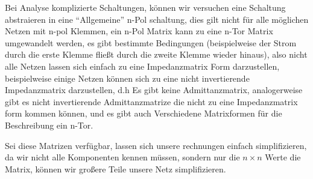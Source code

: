 %
%
%
Bei Analyse komplizierte Schaltungen, können wir versuchen eine Schaltung abstraieren in eine \enquote{Allgemeine} n-Pol schaltung, dies gilt nicht für alle möglichen Netzen mit n-pol Klemmen, ein n-Pol Matrix kann zu eine n-Tor Matrix umgewandelt werden, es gibt bestimmte Bedingungen (beispielweise der Strom durch die erste Klemme fließt durch die zweite Klemme wieder hinaus), also nicht alle Netzen lassen sich einfach zu eine Impedanzmatrix Form darzustellen, beispielweise einige Netzen können sich zu eine nicht invertierende Impedanzmatrix darzustellen, d.h Es gibt keine Admittanzmatrix, analogerweise gibt es nicht invertierende Admittanzmatrize die nicht zu eine Impedanzmatrix form kommen können, und es gibt auch Verschiedene Matrixformen für die Beschreibung ein n-Tor. 

Sei diese Matrizen verfügbar, lassen sich unsere rechnungen einfach simplifizieren, da wir nicht alle Komponenten kennen müssen, sondern nur die $n\times n$ Werte die Matrix, können wir großere Teile unsere Netz simplifizieren.
%
\begin{flushright}
  \textit{\autorA}
\end{flushright}
%
%
%
%